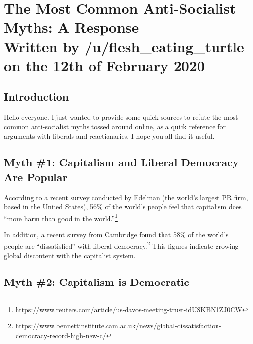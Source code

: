 \section{The Most Common Anti-Socialist Myths: A Response\\\small{Written by /u/flesh\_eating\_turtle on the 12th of February 2020}}
\subsection*{Introduction}

Hello everyone.
I just wanted to provide some quick sources to refute the most common anti-socialist myths tossed around online, as a quick reference for arguments with liberals and reactionaries.
I hope you all find it useful.

\subsection*{Myth \#1: Capitalism and Liberal Democracy Are Popular}

According to a recent survey conducted by Edelman (the world's largest PR firm, based in the United States), 56\% of the world's people feel that capitalism does ``more harm than good in the world.''\footnote{\href{https://www.reuters.com/article/us-davos-meeting-trust-idUSKBN1ZJ0CW}{https://www.reuters.com/article/us-davos-meeting-trust-idUSKBN1ZJ0CW}}

In addition, a recent survey from Cambridge found that 58\% of the world's people are ``dissatisfied'' with liberal democracy.\footnote{\href{https://www.bennettinstitute.cam.ac.uk/news/global-dissatisfaction-democracy-record-high-new-c/}{https://www.bennettinstitute.cam.ac.uk/news/global-dissatisfaction-democracy-record-high-new-c/}}
This figures indicate growing global discontent with the capitalist system.

\subsection*{Myth \#2: Capitalism is Democratic}

